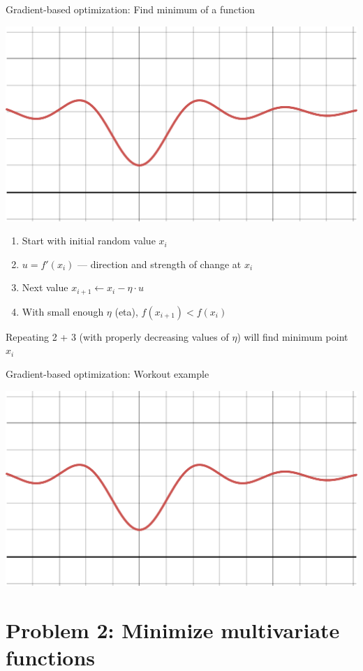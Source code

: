\documentclass[12pt,aspectratio=169,handout]{beamer}
\begin{document}
\begin{frame}{Gradient-based optimization: Find minimum of a function}
	
	\includegraphics[width=0.4\linewidth]{img/desmos-graph1.pdf}
	
	
	\begin{enumerate}
		\item Start with initial random value $x_i$
		\item $u = f'(x_i)$ --- direction and strength of change at $x_i$
		\item Next value $x_{i + 1} \gets x_i - \eta \cdot u$
		\item With small enough $\eta$ (eta), $f(x_{i+1}) < f(x_i)$
	\end{enumerate}
	Repeating 2 + 3 (with properly decreasing values of $\eta$) will find minimum point $x_i$
	
	
	
\end{frame}


\begin{frame}{Gradient-based optimization: Workout example}
	
	\includegraphics[width=0.99\linewidth]{img/desmos-graph1.pdf}
	
	
\end{frame}


\section{Problem 2: Minimize multivariate functions}
\end{document}

